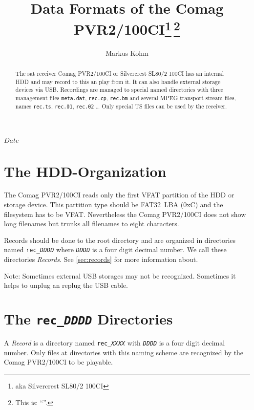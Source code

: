 \documentclass{scrartcl}
\newcommand*{\Comag}{Comag PVR2/100CI\xspace}
\begin{document}
\title{Data Formats of the Comag PVR2/100CI\footnote{aka Silvercrest SL80/2
    100CI}\,\footnote{This is: ``\SVNId''.}}
\author{Markus Kohm}
\SVNdate $Date$
\maketitle
\begin{abstract}
  The sat receiver Comag PVR2/100CI or Silvercrest SL80/2 100CI has an
  internal HDD and may record to this an play from it. It can also handle
  external storage devices via USB. Recordings are managed to special named
  directories with three management files \texttt{meta.dat}, \texttt{rec.cp},
  \texttt{rec.bm} and several MPEG transport stream files, names
  \texttt{rec.ts}, \texttt{rec.01}, \texttt{rec.02} \dots
  Only special TS files can be used by the receiver.
\end{abstract}

\tableofcontents

\section{The HDD-Organization}
\label{sec:hdd-organization}

The \Comag reads only the first VFAT partition of the HDD or storage
device. This partition type should be FAT32~LBA (0xC) and the filesystem has
to be VFAT. Nevertheless the \Comag does not show long filenames but trunks
all filenames to eight characters.

Records should be done to the root directory and are organized in directories
named \texttt{rec\_\textit{DDDD}} where \texttt{\textit{DDDD}} is a four digit
decimal number. We call these directories \emph{Records}. See
\autoref{sec:records} for more information about.

Note: Sometimes external USB storages may not be recognized. Sometimes it
helps to unplug an replug the USB cable.

\section{The \texttt{rec\_\textit{DDDD}} Directories}
\label{sec:records}

A \emph{Record} is a directory named \texttt{rec\_\textit{XXXX}} with
\texttt{\textit{DDDD}} is a four digit decimal number. Only files at
directories with this naming scheme are recognized by the \Comag to be
playable.
\end{document}
